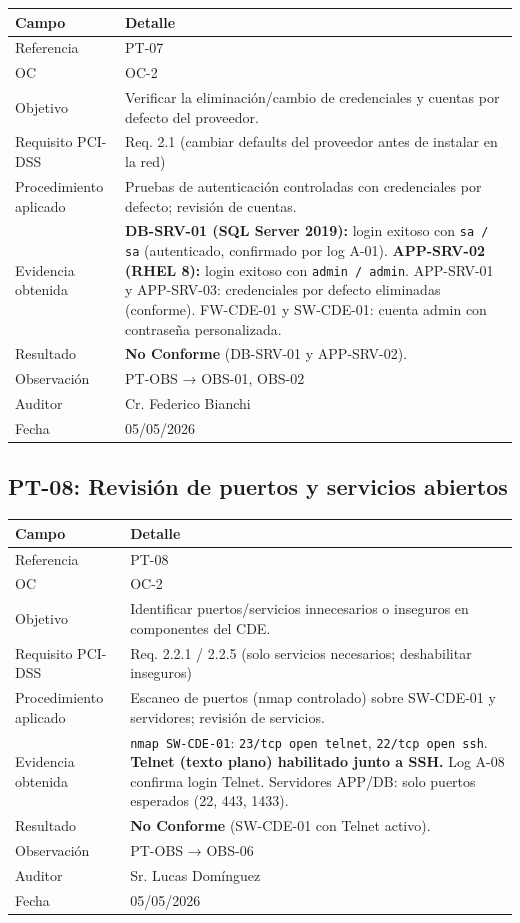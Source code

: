\documentclass[11pt,a4paper]{article}
\begin{document}
\begin{tabularx}{\textwidth}{P{5cm}L}
\toprule
\textbf{Campo} & \textbf{Detalle} \\
\midrule
Referencia & PT-07 \\
OC & OC-2 \\
Objetivo & Verificar la eliminación/cambio de credenciales y cuentas por defecto del proveedor. \\
Requisito PCI-DSS & Req. 2.1 (cambiar defaults del proveedor antes de instalar en la red) \\
Procedimiento aplicado & Pruebas de autenticación controladas con credenciales por defecto; revisión de cuentas. \\
Evidencia obtenida & \textbf{DB-SRV-01 (SQL Server 2019):} login exitoso con \texttt{sa / sa} (autenticado, confirmado por log A-01). \textbf{APP-SRV-02 (RHEL 8):} login exitoso con \texttt{admin / admin}. APP-SRV-01 y APP-SRV-03: credenciales por defecto eliminadas (conforme). FW-CDE-01 y SW-CDE-01: cuenta admin con contraseña personalizada. \\
Resultado & \textbf{No Conforme} (DB-SRV-01 y APP-SRV-02). \\
Observación & PT-OBS → OBS-01, OBS-02 \\
Auditor & Cr. Federico Bianchi \\
Fecha & 05/05/2026 \\
\bottomrule
\end{tabularx}

\subsection{PT-08: Revisión de puertos y servicios abiertos}

\begin{tabularx}{\textwidth}{P{5cm}L}
\toprule
\textbf{Campo} & \textbf{Detalle} \\
\midrule
Referencia & PT-08 \\
OC & OC-2 \\
Objetivo & Identificar puertos/servicios innecesarios o inseguros en componentes del CDE. \\
Requisito PCI-DSS & Req. 2.2.1 / 2.2.5 (solo servicios necesarios; deshabilitar inseguros) \\
Procedimiento aplicado & Escaneo de puertos (nmap controlado) sobre SW-CDE-01 y servidores; revisión de servicios. \\
Evidencia obtenida & \texttt{nmap SW-CDE-01}: \texttt{23/tcp open telnet}, \texttt{22/tcp open ssh}. \textbf{Telnet (texto plano) habilitado junto a SSH.} Log A-08 confirma login Telnet. Servidores APP/DB: solo puertos esperados (22, 443, 1433). \\
Resultado & \textbf{No Conforme} (SW-CDE-01 con Telnet activo). \\
Observación & PT-OBS → OBS-06 \\
Auditor & Sr. Lucas Domínguez \\
Fecha & 05/05/2026 \\
\bottomrule
\end{tabularx}
\end{document}
